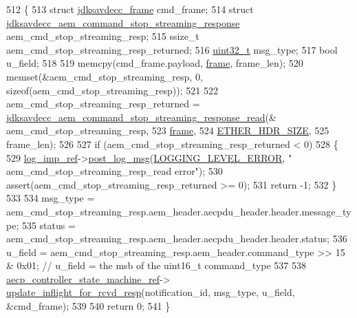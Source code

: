 \begin{DoxyCode}
512 \{
513     \textcolor{keyword}{struct }\hyperlink{structjdksavdecc__frame}{jdksavdecc\_frame} cmd\_frame;
514     \textcolor{keyword}{struct }\hyperlink{structjdksavdecc__aem__command__stop__streaming__response}{jdksavdecc\_aem\_command\_stop\_streaming\_response} 
      aem\_cmd\_stop\_streaming\_resp;
515     ssize\_t aem\_cmd\_stop\_streaming\_resp\_returned;
516     \hyperlink{parse_8c_a6eb1e68cc391dd753bc8ce896dbb8315}{uint32\_t} msg\_type;
517     \textcolor{keywordtype}{bool} u\_field;
518 
519     memcpy(cmd\_frame.payload, \hyperlink{gst__avb__playbin_8c_ac8e710e0b5e994c0545d75d69868c6f0}{frame}, frame\_len);
520     memset(&aem\_cmd\_stop\_streaming\_resp, 0, \textcolor{keyword}{sizeof}(aem\_cmd\_stop\_streaming\_resp));
521 
522     aem\_cmd\_stop\_streaming\_resp\_returned = 
      \hyperlink{group__command__stop__streaming__response_ga50d25eaa408322fe1b3ca4ca1bc8fa19}{jdksavdecc\_aem\_command\_stop\_streaming\_response\_read}(&
      aem\_cmd\_stop\_streaming\_resp,
523                                                                                                
      \hyperlink{gst__avb__playbin_8c_ac8e710e0b5e994c0545d75d69868c6f0}{frame},
524                                                                                                
      \hyperlink{namespaceavdecc__lib_a6c827b1a0d973e18119c5e3da518e65ca9512ad9b34302ba7048d88197e0a2dc0}{ETHER\_HDR\_SIZE},
525                                                                                                frame\_len);
526 
527     \textcolor{keywordflow}{if} (aem\_cmd\_stop\_streaming\_resp\_returned < 0)
528     \{
529         \hyperlink{namespaceavdecc__lib_acbe3e2a96ae6524943ca532c87a28529}{log\_imp\_ref}->\hyperlink{classavdecc__lib_1_1log_a68139a6297697e4ccebf36ccfd02e44a}{post\_log\_msg}(\hyperlink{namespaceavdecc__lib_a501055c431e6872ef46f252ad13f85cdaf2c4481208273451a6f5c7bb9770ec8a}{LOGGING\_LEVEL\_ERROR}, \textcolor{stringliteral}{"
      aem\_cmd\_stop\_streaming\_resp\_read error"});
530         assert(aem\_cmd\_stop\_streaming\_resp\_returned >= 0);
531         \textcolor{keywordflow}{return} -1;
532     \}
533 
534     msg\_type = aem\_cmd\_stop\_streaming\_resp.aem\_header.aecpdu\_header.header.message\_type;
535     status = aem\_cmd\_stop\_streaming\_resp.aem\_header.aecpdu\_header.header.status;
536     u\_field = aem\_cmd\_stop\_streaming\_resp.aem\_header.command\_type >> 15 & 0x01; \textcolor{comment}{// u\_field = the msb of the
       uint16\_t command\_type}
537 
538     \hyperlink{namespaceavdecc__lib_a0b1b5aea3c0490f77cbfd9178af5be22}{aecp\_controller\_state\_machine\_ref}->
      \hyperlink{classavdecc__lib_1_1aecp__controller__state__machine_a997abd9786c330a5505e903e6443208e}{update\_inflight\_for\_rcvd\_resp}(notification\_id, msg\_type, u\_field, &cmd\_frame);
539 
540     \textcolor{keywordflow}{return} 0;
541 \}
\end{DoxyCode}


